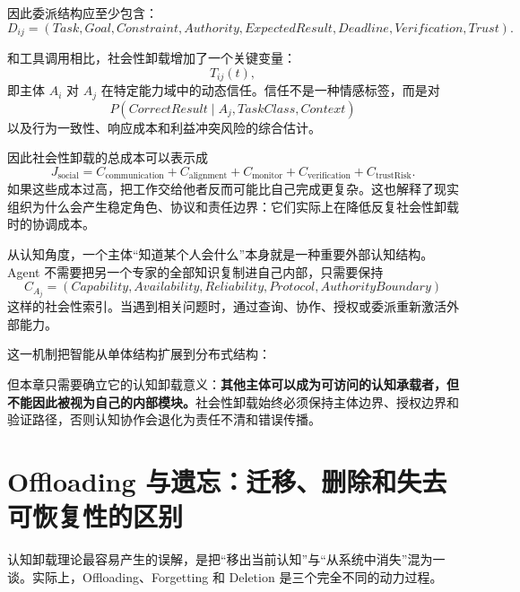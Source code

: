 因此委派结构应至少包含：
\begin{equation}
D_{ij}
=
(
Task,
Goal,
Constraint,
Authority,
ExpectedResult,
Deadline,
Verification,
Trust
).
\end{equation}

和工具调用相比，社会性卸载增加了一个关键变量：
\begin{equation}
T_{ij}(t),
\end{equation}
即主体 $A_i$ 对 $A_j$ 在特定能力域中的动态信任。信任不是一种情感标签，而是对
\begin{equation}
P(
CorrectResult
\mid
A_j,
TaskClass,
Context
)
\end{equation}
以及行为一致性、响应成本和利益冲突风险的综合估计。

因此社会性卸载的总成本可以表示成
\begin{equation}
J_{\mathrm{social}}
=
C_{\mathrm{communication}}
+
C_{\mathrm{alignment}}
+
C_{\mathrm{monitor}}
+
C_{\mathrm{verification}}
+
C_{\mathrm{trustRisk}}.
\end{equation}
如果这些成本过高，把工作交给他者反而可能比自己完成更复杂。这也解释了现实组织为什么会产生稳定角色、协议和责任边界：它们实际上在降低反复社会性卸载时的协调成本。

从认知角度，一个主体“知道某个人会什么”本身就是一种重要外部认知结构。Agent 不需要把另一个专家的全部知识复制进自己内部，只需要保持
\begin{equation}
C_{A_j}
=
(
Capability,
Availability,
Reliability,
Protocol,
AuthorityBoundary
)
\end{equation}
这样的社会性索引。当遇到相关问题时，通过查询、协作、授权或委派重新激活外部能力。

这一机制把智能从单体结构扩展到分布式结构：
\begin{statementbox}
\centering
{}
\end{statementbox}
但本章只需要确立它的认知卸载意义：\textbf{其他主体可以成为可访问的认知承载者，但不能因此被视为自己的内部模块。}社会性卸载始终必须保持主体边界、授权边界和验证路径，否则认知协作会退化为责任不清和错误传播。

\section{Offloading 与遗忘：迁移、删除和失去可恢复性的区别}

认知卸载理论最容易产生的误解，是把“移出当前认知”与“从系统中消失”混为一谈。实际上，Offloading、Forgetting 和 Deletion 是三个完全不同的动力过程。

